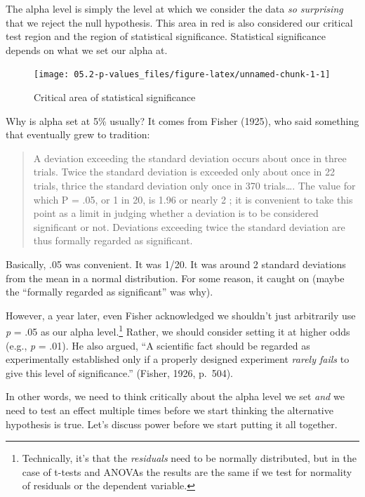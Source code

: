 \documentclass[
]{book}
\begin{document}
The alpha level is simply the level at which we consider the data \emph{so surprising} that we reject the null hypothesis. This area in red is also considered our critical test region and the region of statistical significance. Statistical significance depends on what we set our alpha at.

\begin{figure}

{\centering \texttt{[image: 05.2-p-values\_files/figure-latex/unnamed-chunk-1-1]} 

}

\caption{Critical area of statistical significance}\label{fig:unnamed-chunk-1}
\end{figure}

Why is alpha set at 5\% usually? It comes from Fisher (1925), who said something that eventually grew to tradition:

\begin{quote}
A deviation exceeding the standard deviation occurs about once in three trials. Twice the standard deviation is exceeded only about once in 22 trials, thrice the standard deviation only once in 370 trials\ldots. The value for which P = .05, or 1 in 20, is 1.96 or nearly 2 ; it is convenient to take this point as a limit in judging whether a deviation is to be considered significant or not. Deviations exceeding twice the standard deviation are thus formally regarded as significant.
\end{quote}

Basically, .05 was convenient. It was 1/20. It was around 2 standard deviations from the mean in a normal distribution. For some reason, it caught on (maybe the ``formally regarded as significant'' was why).

However, a year later, even Fisher acknowledged we shouldn't just arbitrarily use \emph{p} = .05 as our alpha level.\footnote{Technically, it's that the \emph{residuals} need to be normally distributed, but in the case of t-tests and ANOVAs the results are the same if we test for normality of residuals or the dependent variable.} Rather, we should consider setting it at higher odds (e.g., \emph{p} = .01). He also argued, ``A scientific fact should be regarded as experimentally established only if a properly designed experiment \emph{rarely fails} to give this level of significance.'' (Fisher, 1926, p.~504).

In other words, we need to think critically about the alpha level we set \emph{and} we need to test an effect multiple times before we start thinking the alternative hypothesis is true. Let's discuss power before we start putting it all together.
\end{document}

